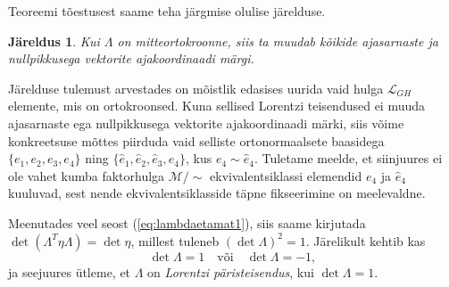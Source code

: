 \documentclass[12pt,a4paper,oneside]{article}
\theoremstyle{plain}
\newtheorem{jareldus}{Järeldus}[section]
\theoremstyle{definition}
\numberwithin{equation}{section}
\def\L{{\mathcal L}}
\def\M{{\mathcal M}}
\begin{document}
Teoreemi tõestusest saame teha järgmise olulise järelduse.
\begin{jareldus}
Kui $\Lambda$ on mitteortokroonne, siis ta muudab kõikide 
ajasarnaste ja nullpikkusega vektorite ajakoordinaadi märgi.
\end{jareldus}

Järelduse tulemust arvestades on mõistlik edasises uurida vaid 
hulga $\L_{GH}$ elemente, mis on ortokroonsed. Kuna sellised 
Lorentzi teisendused ei muuda ajasarnaste ega nullpikkusega 
vektorite ajakoordinaadi märki, siis võime konkreetsuse mõttes 
piirduda vaid selliste ortonormaalsete baasidega 
$\{e_1, e_2, e_3, e_4\}$ ning $\{\hat{e}_1, \hat{e}_2, \hat{e}_3, 
\hat{e}_4\}$, kus $e_4 \sim \hat{e}_4$. Tuletame meelde, et 
siinjuures ei ole vahet kumba faktorhulga $\M / {\sim}$ 
ekvivalentsiklassi elemendid $e_4$ ja $\hat{e}_4$ kuuluvad, sest 
nende ekvivalentsiklasside täpne fikseerimine on meelevaldne.

Meenutades veel seost (\ref{eq:lambdaetamat1}), siis saame kirjutada 
$\det\left(\Lambda^T \eta \Lambda\right) = \det \eta$, millest 
tuleneb $\left(\det \Lambda\right)^2 = 1$. Järelikult kehtib kas
\begin{equation*}
\det \Lambda = 1 \quad \text{või} \quad \det \Lambda = -1,
\end{equation*}
ja seejuures ütleme, et $\Lambda$ on \emph{Lorentzi päristeisendus}, 
kui $\det \Lambda = 1$.
\end{document}
